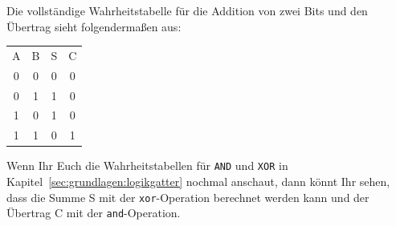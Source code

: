       Die vollständige Wahrheitstabelle für die Addition von zwei Bits und den Übertrag sieht folgendermaßen aus:
      \begin{center}
        \begin{tabular}{c|c!{\vrule width 1pt}c|c}
        A & B & S & C \\\Xhline{1pt}
        0 & 0 & 0 & 0 \\
        0 & 1 & 1 & 0 \\
        1 & 0 & 1 & 0 \\
        1 & 1 & 0 & 1 \\
        \end{tabular}
      \end{center}
      Wenn Ihr Euch die Wahrheitstabellen für \texttt{AND} und \texttt{XOR} in Kapitel~\ref{sec:grundlagen:logikgatter} nochmal anschaut, dann könnt Ihr sehen, dass die Summe S mit der \texttt{xor}-Operation berechnet werden kann und der Übertrag C mit der \texttt{and}-Operation.
